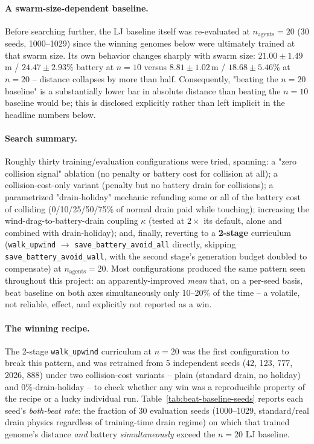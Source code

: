 \documentclass[11pt]{article}
\begin{document}
\paragraph{A swarm-size-dependent baseline.} Before searching further, the LJ baseline itself
was re-evaluated at $n_{\text{agents}}=20$ (30 seeds, 1000--1029) since the winning genomes below
were ultimately trained at that swarm size. Its own behavior changes sharply with swarm size:
$21.00\pm1.49$\,m / $24.47\pm2.93\%$ battery at $n{=}10$ versus $8.81\pm1.02$\,m /
$18.68\pm5.46\%$ at $n{=}20$ -- distance collapses by more than half. Consequently, "beating the
$n{=}20$ baseline" is a substantially lower bar in absolute distance than beating the $n{=}10$
baseline would be; this is disclosed explicitly rather than left implicit in the headline numbers
below.

\paragraph{Search summary.} Roughly thirty training/evaluation configurations were tried,
spanning: a "zero collision signal" ablation (no penalty or battery cost for collision at all);
a collision-cost-only variant (penalty but no battery drain for collisions); a parametrized
"drain-holiday" mechanic refunding some or all of the battery cost of colliding
(0/10/25/50/75\% of normal drain paid while touching); increasing the wind-drag-to-battery-drain
coupling $\kappa$ (tested at $2\times$ its default, alone and combined with drain-holiday); and,
finally, reverting to a \textbf{2-stage} curriculum (\texttt{walk\_upwind}
$\to$ \texttt{save\_battery\_avoid\_all} directly, skipping \texttt{save\_battery\_avoid\_wall},
with the second stage's generation budget doubled to compensate) at $n_{\text{agents}}=20$. Most
configurations produced the same pattern seen throughout this project: an apparently-improved
\emph{mean} that, on a per-seed basis, beat baseline on both axes simultaneously only 10--20\% of
the time -- a volatile, not reliable, effect, and explicitly not reported as a win.

\paragraph{The winning recipe.} The 2-stage \texttt{walk\_upwind} curriculum at $n{=}20$ was the
first configuration to break this pattern, and was retrained from 5 independent seeds (42, 123,
777, 2026, 888) under two collision-cost variants -- plain (standard drain, no holiday) and
0\%-drain-holiday -- to check whether any win was a reproducible property of the recipe or a
lucky individual run. Table~\ref{tab:beat-baseline-seeds} reports each seed's \emph{both-beat
rate}: the fraction of 30 evaluation seeds (1000--1029, standard/real drain physics regardless of
training-time drain regime) on which that trained genome's distance \emph{and} battery
\emph{simultaneously} exceed the $n{=}20$ LJ baseline.
\end{document}
